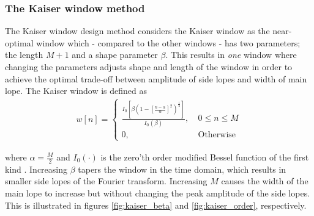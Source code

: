 \subsubsection{The Kaiser window method}
The Kaiser window design method considers the Kaiser window as the near-optimal window which - compared to the other windows - has two parameters; the length $M+1$ and a shape parameter $\beta$. This results in \textit{one} window where changing the parameters adjusts shape and length of the window in order to achieve the optimal trade-off between amplitude of side lopes and width of main lope. The Kaiser window is defined as 
\begin{align}
w[n]=\left\{\begin{matrix}
 \frac{I_0[\beta (1-[\frac{n-\alpha}{\alpha}]^2)^{\frac{1}{2}}]}{I_0(\beta)} , &\ 0 \leq n \leq M  \\ 
0, &\ \text{Otherwise}
\end{matrix}\right.
\end{align}

where $\alpha=\frac{M}{2}$ and $I_0(\cdot)$ is the zero'th order modified Bessel function of the first kind \cite{DTSP, page 474-476}. Increasing $\beta$ tapers the window in the time domain, which results in smaller side lopes of the Fourier transform. Increasing $M$ causes the width of the main lope to increase but without changing the peak amplitude of the side lopes. This is illustrated in figures \ref{fig:kaiser_beta} and \ref{fig:kaiser_order}, respectively.\\

